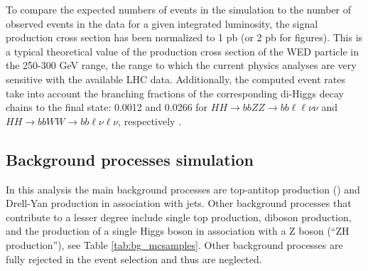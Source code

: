 To compare the expected numbers of events in the simulation to the number of observed events in the data for a given integrated luminosity, the signal production cross section has been normalized to 1 pb (or 2 pb for figures). This is a typical theoretical value of the production cross section of the WED particle in the 250-300 GeV range, the range to which the current physics analyses are very sensitive with the available LHC data. Additionally, the computed event rates take into account the branching fractions of the corresponding di-Higgs decay chains to the final state: 0.0012 and 0.0266 for $HH\to bbZZ\to bb\ell\ell\nu\nu$ and $HH\to bbWW\to bb\ell\nu\ell\nu$, respectively \cite{CERNYR4}.

\subsection{Background processes simulation\label{sec:bkgMC}}
In this analysis the main background processes are top-antitop production (\ttbar) and Drell-Yan production in association with jets. 
Other background processes that contribute to a lesser degree include single top production, diboson production, and the production of a single Higgs boson in association with a Z boson (``ZH production''), see Table \ref{tab:bg_mcsamples}. Other background processes are fully rejected in the event selection and thus are neglected. 


